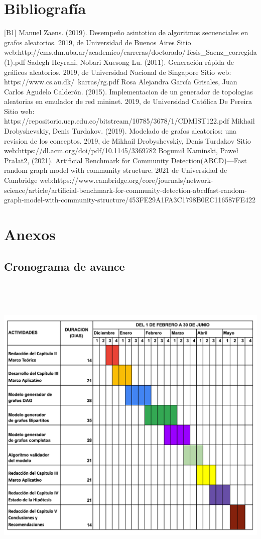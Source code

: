 \documentclass[11pt]{extarticle}
\begin{document}
\section{Bibliograf\'ia}
  [B1] Manuel Zaens. (2019). Desempeño asintotico de algoritmos secuenciales en grafos aleatorios. 2019, de Universidad de Buenos Aires Sitio web:\hfill\break http://cms.dm.uba.ar/academico/carreras/doctorado/Tesis\_Saenz\_corregida(1).pdf \hfill \break
  \break
  [B2] Sadegh Heyrani, Nobari Xuesong Lu. (2011). Generaci\'on r\'apida de gr\'aficos aleatorios. 2019, de Universidad Nacional de Singapore Sitio web: https://www.cs.au.dk/~karras/rg.pdf
  \break
  \break
  [B3] Rosa Alejandra Garc\'ia Grisales, Juan Carlos Agudelo Calder\'on. (2015). Implementacion de un generador de topologias aleatorias en emulador de red mininet. 2019, de Universidad Cat\'olica De Pereira Sitio web: https://repositorio.ucp.edu.co/bitstream/10785/3678/1/CDMIST122.pdf
  \break
  \break
  [B4] Mikhail Drobyshevskiy, Denis Turdakov. (2019). Modelado de grafos aleatorios: una revis\'ion de los conceptos. 2019, de Mikhail Drobyshevskiy, Denis Turdakov Sitio web:\hfill\break https://dl.acm.org/doi/pdf/10.1145/3369782
  \break
  \break
  [B5] Bogumił Kaminski, Paweł Prałat2, (2021). Artificial Benchmark for Community Detection(ABCD)—Fast random graph model with community structure. 2021 de Universidad de Cambridge web:\hfill\break https://www.cambridge.org/core/journals/network-science/article/artificial-benchmark-for-community-detection-abcdfast-random-graph-model-with-community-structure/453FE29A1FA3C1798B0EC116587FE422
\section{Anexos}
\subsection{Cronograma de avance}
\includegraphics[width=18cm,height=15cm]{calendario.png}
\end{document}
